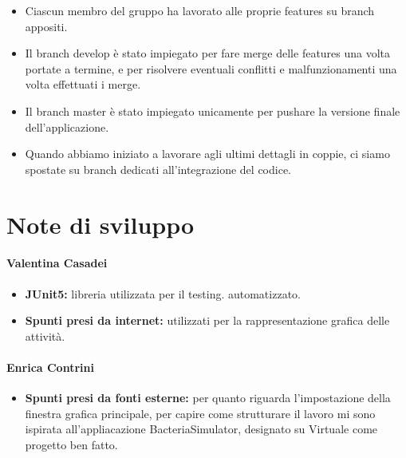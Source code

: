 \documentclass[a4paper,12pt]{report}
\begin{document}
\begin{itemize}
	\item Ciascun membro del gruppo ha lavorato alle proprie features su branch appositi.
	\item Il branch develop è stato impiegato per fare merge delle features una volta portate a termine, e per risolvere eventuali conflitti e malfunzionamenti una volta effettuati i merge.
	\item Il branch master è stato impiegato unicamente per pushare la versione finale dell'applicazione.
	\item Quando abbiamo iniziato a lavorare agli ultimi dettagli in coppie, ci siamo spostate su branch dedicati all'integrazione del codice.
\end{itemize}

\section{Note di sviluppo}

\paragraph{Valentina Casadei}
\begin{itemize}
\item \textbf{JUnit5:} libreria utilizzata per il testing. automatizzato.
\item \textbf{Spunti presi da internet:} utilizzati per la rappresentazione grafica delle attività.
\end{itemize}

\paragraph{Enrica Contrini}
\begin{itemize}
\item \textbf{Spunti presi da fonti esterne:} per quanto riguarda l'impostazione della finestra grafica principale, per capire come strutturare il lavoro mi sono ispirata all'appliacazione BacteriaSimulator, designato su Virtuale come progetto ben fatto.
\end{itemize}
\end{document}
